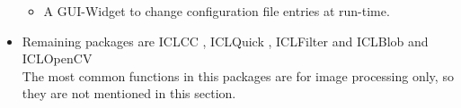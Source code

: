 \begin{itemize}
\begin{itemize}
        \item A GUI-Widget to change configuration file entries at run-time.\\
\end{itemize}

\item Remaining packages are ICLCC , ICLQuick , ICLFilter  and ICLBlob  and ICLOpenCV \\
The most common functions in this packages are for image processing only, so they are not mentioned in this section.


\end{itemize}

